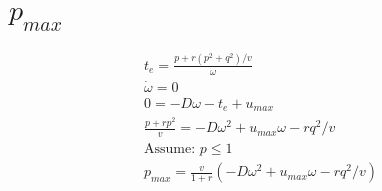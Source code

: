 \documentclass{article}
\begin{document}
\section{$p_{max}$}
\begin{align}
t_e=\frac{p+r(p^2+q^2)/v}{\omega} \\
\dot{\omega}=0 \\
0=-D \omega-t_e+u_{max} \\
\frac{p+r p^2}{v}=-D\omega^2+u_{max}\omega- r q^2/v\\
\text{Assume: }p\leq1\\
p_{max}=\frac{v}{1+r}\left(-D\omega^2+u_{max}\omega- r q^2/v\right)
\end{align}
\end{document}
